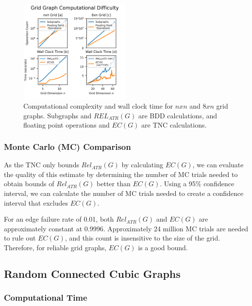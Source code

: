 \documentclass[12pt,twocolumn]{article}
\begin{document}
\begin{figure}[t]
\caption{Computational complexity and wall clock time for $nxn$ and $8xn$ grid graphs. Subgraphs and $REL_{ATR}(G)$ are BDD calculations, and floating point operations and $EC(G)$ are TNC calculations.}
\label{fig:Grid Graph Computational Time}
\includegraphics[width=0.5\textwidth]{../figures/GridGraphComputeTime8.png}
\end{figure}

\hypertarget{monte-carlo-mc-comparison}{%
\subsubsection{Monte Carlo (MC) Comparison}\label{monte-carlo-mc-comparison}}

As the TNC only bounds \(Rel_{ATR}(G)\) by calculating \(EC(G)\), we can evaluate the quality of this estimate by determining the number of MC trials needed to obtain bounds of \(Rel_{ATR}(G)\) better than \(EC(G)\). Using a 95\% confidence interval, we can calculate the number of MC trials needed to create a confidence interval that excludes \(EC(G)\).

For an edge failure rate of 0.01, both \(Rel_{ATR}(G)\) and \(EC(G)\) are approximately constant at 0.9996. Approximately 24 million MC trials are needed to rule out \(EC(G)\), and this count is insensitive to the size of the grid. Therefore, for reliable grid graphs, \(EC(G)\) is a good bound.

\hypertarget{random-connected-cubic-graphs}{%
\subsection{Random Connected Cubic Graphs}\label{random-connected-cubic-graphs}}

\hypertarget{computational-time-1}{%
\subsubsection{Computational Time}\label{computational-time-1}}
\end{document}
